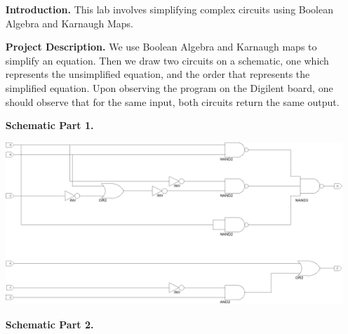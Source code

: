 \documentclass[9pt]{article}
\begin{document}
\begin{enumerate}
   \item[\textbf{Introduction.}]  This lab involves simplifying complex
   circuits using Boolean Algebra and Karnaugh Maps.
   \item[\textbf{Project Description.}]  We use Boolean Algebra and Karnaugh
   maps to simplify an equation. Then we draw two circuits on a schematic, one
   which represents the unsimplified equation, and the order that represents the
   simplified equation. Upon observing the program on the Digilent board, one should
   observe that  for the same input, both circuits return the same output.
  	\item[\textbf{Schematic Part 1.}] \text{ }
   
             \begin{center}
                \includegraphics[width=\textwidth]{schematic.png}
             \end{center}
   
  	\item[\textbf{Schematic Part 2.}] \text{ }
   

\end{enumerate}
\end{document}
